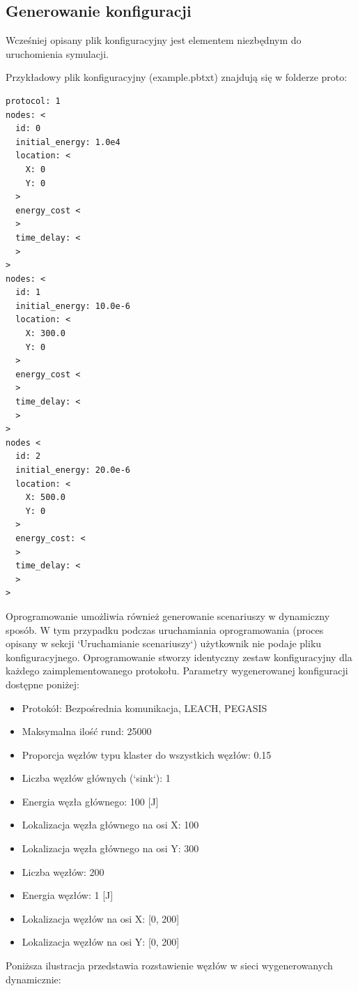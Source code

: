 \documentclass[a4paper,12pt,twoside,openany]{report}
\begin{document}
\subsection{Generowanie konfiguracji}

Wcześniej opisany plik konfiguracyjny jest elementem niezbędnym do uruchomienia symulacji.

Przykładowy plik konfiguracyjny (example.pbtxt) znajdują się w folderze proto:

\begin{lstlisting}
protocol: 1
nodes: <
  id: 0
  initial_energy: 1.0e4
  location: <
    X: 0
    Y: 0
  >
  energy_cost <
  >
  time_delay: <
  >
>
nodes: <
  id: 1
  initial_energy: 10.0e-6
  location: <
    X: 300.0
    Y: 0
  >
  energy_cost <
  >
  time_delay: <
  >
>
nodes <
  id: 2
  initial_energy: 20.0e-6
  location: <
    X: 500.0
    Y: 0
  >
  energy_cost: <
  >
  time_delay: <
  >
>
\end{lstlisting}

Oprogramowanie umożliwia również generowanie scenariuszy w dynamiczny sposób.
W tym przypadku podczas uruchamiania oprogramowania (proces opisany w sekcji `Uruchamianie scenariuszy`)
użytkownik nie podaje pliku konfiguracyjnego. Oprogramowanie stworzy identyczny zestaw konfiguracyjny
dla każdego zaimplementowanego protokołu. Parametry wygenerowanej konfiguracji dostępne poniżej:

\begin{itemize}
 \item Protokół: Bezpośrednia komunikacja, LEACH, PEGASIS
 \item Maksymalna ilość rund: 25000
 \item Proporcja węzłów typu klaster do wszystkich węzłów: 0.15
 \item Liczba węzłów głównych (`sink`): 1
 \item Energia węzła głównego: 100 [J]
 \item Lokalizacja węzła głównego na osi X: 100
 \item Lokalizacja węzła głównego na osi Y: 300
 \item Liczba węzłów: 200
 \item Energia węzłów: 1 [J]
 \item Lokalizacja węzłów na osi X: [0, 200]
 \item Lokalizacja węzłów na osi Y: [0, 200]
\end{itemize}

Poniższa ilustracja przedstawia rozstawienie węzłów w sieci wygenerowanych dynamicznie:
\end{document}
